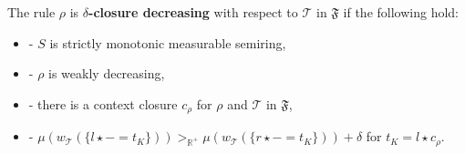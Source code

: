 \begin{definition}
    \noindent
    The rule $\rho$ is
            \textbf{$\delta$-closure decreasing} with respect to $\mathcal{T}$ in $\mathfrak{F}$ if the following hold:
            \begin{itemize}
                \item[]- $S$ is strictly monotonic measurable semiring,
                \item[]- $\rho$ is weakly decreasing,
                \item[]- there is a context closure $c_\rho$ for $\rho$ and $\mathcal{T}$ in $\mathfrak{F}$,
                \item[]- $ \mu(w_\mathcal{T}(\{l \star - = t_K\}))  >_{\mathbb{R}^+}  \mu(w_\mathcal{T}(\{r \star - = t_K\}))  + \delta$ for $t_K = l \star c_\rho$.
            \end{itemize}
\end{definition}

